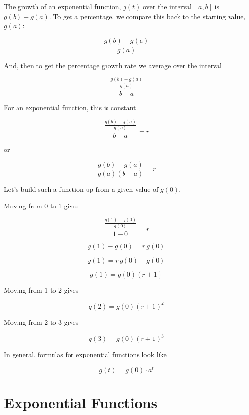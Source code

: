 \documentclass{ximera}
\begin{document}
The growth of an exponential function, $g(t)$ over the interval $[a, b]$ is $g(b)-g(a)$. To get a percentage, we compare this back to the starting value, $g(a)$: 

\[      \frac{g(b)-g(a)}{g(a)}    \]

And, then to get the percentage growth rate we average over the interval



\[      \frac{\frac{g(b)-g(a)}{g(a)}}{b-a}    \]



For an exponential function, this is constant


\[      \frac{\frac{g(b)-g(a)}{g(a)}}{b-a}  = r  \]

or

\[      \frac{g(b)-g(a)}{g(a)(b-a)}  = r  \]



Let's build such a function up from a given value of $g(0)$. 


\begin{procedure}
Moving from $0$ to $1$ gives

\[      \frac{\frac{g(1)-g(0)}{g(0)}}{1-0}  = r  \]


\[      g(1)-g(0) = r \, g(0)  \]


\[      g(1) = r \, g(0) + g(0)  \]

\[      g(1) =  g(0) (r + 1)  \]



Moving from $1$ to $2$ gives

\[      g(2) =  g(0) (r + 1)^2  \]


Moving from $2$ to $3$ gives

\[      g(3) =  g(0) (r + 1)^3  \]

\end{procedure}


In general, formulas for exponential functions look like


\[      g(t) = g(0) \cdot a^t   \]

















\section{Exponential Functions}
\end{document}
